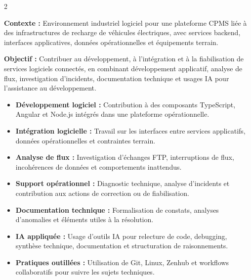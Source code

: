 \documentclass[8pt,a4paper,ragged2e,withhyper]{altacv}
\begin{document}



\makecvheader
\vspace{-0.3cm}


\begin{paracol}{2}



\textbf{Contexte :} Environnement industriel logiciel pour une plateforme CPMS liée à des infrastructures de recharge de véhicules électriques, avec services backend, interfaces applicatives, données opérationnelles et équipements terrain.

\textbf{Objectif :} Contribuer au développement, à l’intégration et à la fiabilisation de services logiciels connectés, en combinant développement applicatif, analyse de flux, investigation d’incidents, documentation technique et usages IA pour l’assistance au développement.

\begin{itemize}
  \item \textbf{Développement logiciel :} Contribution à des composants TypeScript, Angular et Node.js intégrés dans une plateforme opérationnelle.
  \item \textbf{Intégration logicielle :} Travail sur les interfaces entre services applicatifs, données opérationnelles et contraintes terrain.
  \item \textbf{Analyse de flux :} Investigation d’échanges FTP, interruptions de flux, incohérences de données et comportements inattendus.
  \item \textbf{Support opérationnel :} Diagnostic technique, analyse d’incidents et contribution aux actions de correction ou de fiabilisation.
  \item \textbf{Documentation technique :} Formalisation de constats, analyses d’anomalies et éléments utiles à la résolution.
  \item \textbf{IA appliquée :} Usage d’outils IA pour relecture de code, debugging, synthèse technique, documentation et structuration de raisonnements.
  \item \textbf{Pratiques outillées :} Utilisation de Git, Linux, Zenhub et workflows collaboratifs pour suivre les sujets techniques.
\end{itemize}


\end{paracol}
\end{document}

